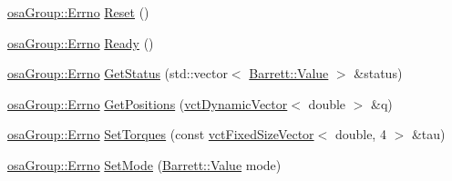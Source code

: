 \begin{DoxyCompactItemize}
\item 
\hyperlink{classosa_group_a3ac590c39198a7533838db29b01b994f}{osa\-Group\-::\-Errno} \hyperlink{classosa_group_aca7603d403c5379abafb02b4e5434851}{Reset} ()
\item 
\hyperlink{classosa_group_a3ac590c39198a7533838db29b01b994f}{osa\-Group\-::\-Errno} \hyperlink{classosa_group_a2533e5a1c10edc37ae7a5f4bb117a7ae}{Ready} ()
\item 
\hyperlink{classosa_group_a3ac590c39198a7533838db29b01b994f}{osa\-Group\-::\-Errno} \hyperlink{classosa_group_a2cba147e3ef62e2f6b902baf7857aa27}{Get\-Status} (std\-::vector$<$ \hyperlink{struct_barrett_a57ff132885344ca62e4b4b691885685b}{Barrett\-::\-Value} $>$ \&status)
\item 
\hyperlink{classosa_group_a3ac590c39198a7533838db29b01b994f}{osa\-Group\-::\-Errno} \hyperlink{classosa_group_af8a471763686871853417adf9282b95b}{Get\-Positions} (\hyperlink{classvct_dynamic_vector}{vct\-Dynamic\-Vector}$<$ double $>$ \&q)
\item 
\hyperlink{classosa_group_a3ac590c39198a7533838db29b01b994f}{osa\-Group\-::\-Errno} \hyperlink{classosa_group_a76dfcc394168160fa19f186b9ee4dd86}{Set\-Torques} (const \hyperlink{classvct_fixed_size_vector}{vct\-Fixed\-Size\-Vector}$<$ double, 4 $>$ \&tau)
\item 
\hyperlink{classosa_group_a3ac590c39198a7533838db29b01b994f}{osa\-Group\-::\-Errno} \hyperlink{classosa_group_ac6d7921d12038c833b6b0738c21588c9}{Set\-Mode} (\hyperlink{struct_barrett_a57ff132885344ca62e4b4b691885685b}{Barrett\-::\-Value} mode)
\end{DoxyCompactItemize}
